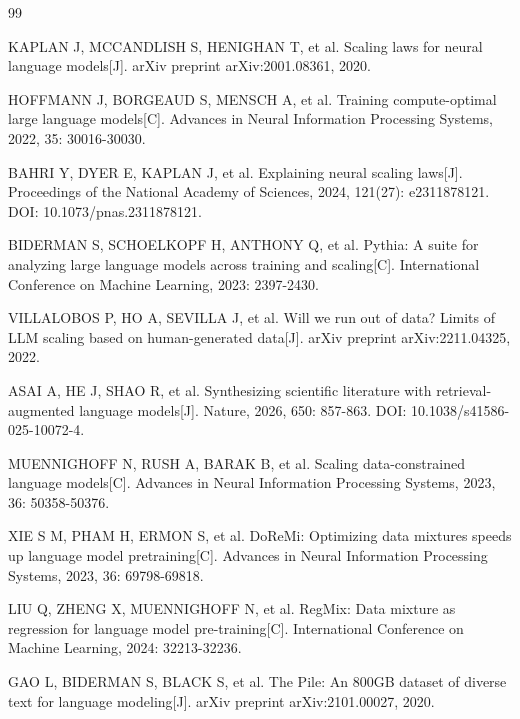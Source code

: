 \newpage
\begin{thebibliography}{99}

 KAPLAN J, MCCANDLISH S, HENIGHAN T, et al. Scaling laws for neural language models[J]. arXiv preprint arXiv:2001.08361, 2020.

 HOFFMANN J, BORGEAUD S, MENSCH A, et al. Training compute-optimal large language models[C]. Advances in Neural Information Processing Systems, 2022, 35: 30016-30030.

 BAHRI Y, DYER E, KAPLAN J, et al. Explaining neural scaling laws[J]. Proceedings of the National Academy of Sciences, 2024, 121(27): e2311878121. DOI: 10.1073/pnas.2311878121.

 BIDERMAN S, SCHOELKOPF H, ANTHONY Q, et al. Pythia: A suite for analyzing large language models across training and scaling[C]. International Conference on Machine Learning, 2023: 2397-2430.

 VILLALOBOS P, HO A, SEVILLA J, et al. Will we run out of data? Limits of LLM scaling based on human-generated data[J]. arXiv preprint arXiv:2211.04325, 2022.

 ASAI A, HE J, SHAO R, et al. Synthesizing scientific literature with retrieval-augmented language models[J]. Nature, 2026, 650: 857-863. DOI: 10.1038/s41586-025-10072-4.

 MUENNIGHOFF N, RUSH A, BARAK B, et al. Scaling data-constrained language models[C]. Advances in Neural Information Processing Systems, 2023, 36: 50358-50376.

 XIE S M, PHAM H, ERMON S, et al. DoReMi: Optimizing data mixtures speeds up language model pretraining[C]. Advances in Neural Information Processing Systems, 2023, 36: 69798-69818.

 LIU Q, ZHENG X, MUENNIGHOFF N, et al. RegMix: Data mixture as regression for language model pre-training[C]. International Conference on Machine Learning, 2024: 32213-32236.

 GAO L, BIDERMAN S, BLACK S, et al. The Pile: An 800GB dataset of diverse text for language modeling[J]. arXiv preprint arXiv:2101.00027, 2020.


\end{thebibliography}
